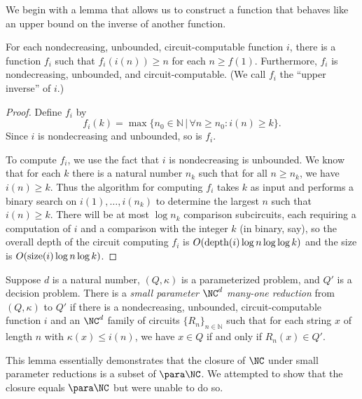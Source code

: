 We begin with a lemma that allows us to construct a function that behaves like an upper bound on the inverse of another function.

\begin{lemma}\label{lem:upperinverse}
  For each nondecreasing, unbounded, circuit-computable function $i$, there is a function $f_i$ such that $f_i(i(n)) \geq n$ for each $n \geq f(1)$.
  Furthermore, $f_i$ is nondecreasing, unbounded, and circuit-computable.
  (We call $f_i$ the ``upper inverse'' of $i$.)
\end{lemma}
\begin{proof}
  Define $f_i$ by
  \[
  f_i(k) = \max\{ n_0 \in \mathbb{N} \, | \, \forall n \geq n_0 \colon i(n) \geq k \}.
  \]
  Since $i$ is nondecreasing and unbounded, so is $f_i$.

  To compute $f_i$, we use the fact that $i$ is nondecreasing is unbounded.
  We know that for each $k$ there is a natural number $n_k$ such that for all $n \geq n_k$, we have $i(n) \geq k$.
  Thus the algorithm for computing $f_i$ takes $k$ as input and performs a binary search on $i(1), \dotsc, i(n_k)$ to determine the largest $n$ such that $i(n) \geq k$.
  There will be at most $\log n_k$ comparison subcircuits, each requiring a computation of $i$ and a comparison with the integer $k$ (in binary, say), so the overall depth of the circuit computing $f_i$ is $O(\operatorname{depth}(i) \log n \log \log k)$ and the size is $O(\operatorname{size}(i) \log n \log k)$.
\end{proof}

\begin{definition}\label{def:spreduction}
  Suppose $d$ is a natural number, $(Q, \kappa)$ is a parameterized problem, and $Q'$ is a decision problem.
  There is a \emph{small parameter $\NC^d$ many-one reduction} from $(Q, \kappa)$ to $Q'$ if there is a nondecreasing, unbounded, circuit-computable function $i$ and an $\NC^d$ family of circuits $\{R_n\}_{n \in \mathbb{N}}$ such that for each string $x$ of length $n$ with $\kappa(x) \leq i(n)$, we have $x \in Q$ if and only if $R_n(x) \in Q'$.
\end{definition}

This lemma essentially demonstrates that the closure of $\NC$ under small parameter reductions is a subset of $\para \NC$.
We attempted to show that the closure equals $\para \NC$ but were unable to do so.

